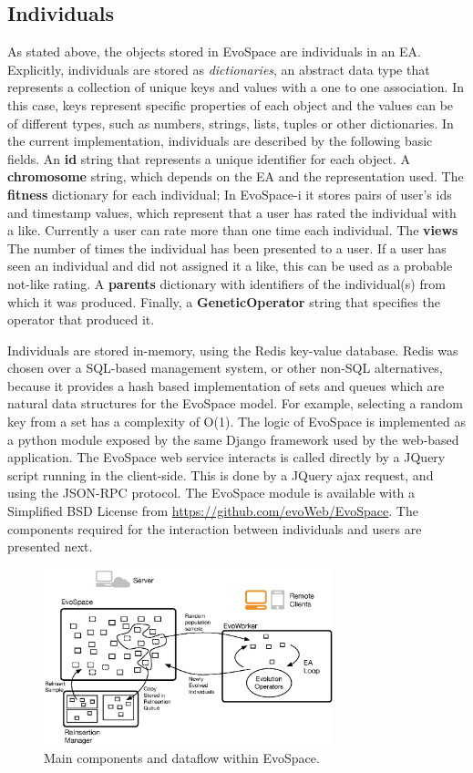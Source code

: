 \documentclass{sig-alternate}
\begin{document}
\subsection{Individuals} %
As stated above, the objects stored in EvoSpace are individuals in an EA.
Explicitly, individuals are stored as \emph{dictionaries}, an abstract data type that represents a collection of unique keys and values with a one to one association. In this case, keys represent specific properties of each object and the values can be of different types, such as
numbers, strings, lists, tuples or other dictionaries.
In the current implementation, individuals are described by the following basic fields.
An \textbf{id} string that represents a unique identifier for each object.
A \textbf{chromosome} string, which depends on the EA and the representation used.
The \textbf{fitness} dictionary for each individual; In EvoSpace-i it stores pairs of user's ids and timestamp values, which represent that a user has rated the individual with a like. Currently a user can rate more than one time each individual.
The \textbf{views} The number of times the individual has been presented to a user. If a user has seen an individual and  did not assigned it a like, this can be used as a probable not-like rating.
A \textbf{parents} dictionary with identifiers of the individual(s) from which it was produced.
Finally, a \textbf{GeneticOperator}  string that specifies the operator that produced it.


Individuals are stored in-memory, using the Redis key-value database. Redis was chosen over a SQL-based management system, or other non-SQL alternatives, because it provides a hash based implementation of sets and queues which are natural data structures for the EvoSpace model. For example, selecting a random key from a set has a complexity of O(1). The logic of EvoSpace is implemented as a python module exposed by the same Django framework used by the web-based application. The EvoSpace web service interacts is called directly by a JQuery script running in the client-side. This is done by a JQuery ajax request, and using the  JSON-RPC protocol.  The EvoSpace module is available with a Simplified BSD License from \url{https://github.com/evoWeb/EvoSpace}.  The components required for the interaction between individuals and users are presented next.

\begin{figure}[!t]
    \centering
        \includegraphics[width=3.3in]{evospaceExample.eps}
    \caption{Main components and dataflow within EvoSpace.}
    \label{fig:evo}
\end{figure}
\end{document}

